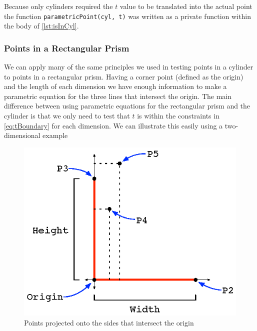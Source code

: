 \documentclass[authoryearcitations]{UoYCSproject}
\begin{document}
Because only cylinders required the $t$ value to be translated into the actual point the function 
\verb+parametricPoint(cyl, t)+ was written as a private function within the body of \ref{lst:isInCyl}.

\subsubsection{Points in a Rectangular Prism}
We can apply many of the same principles we used in testing points in a cylinder to points in a rectangular prism.
Having a corner point (defined as the origin) and the length of each dimension we have enough information to make a
parametric equation for the three lines that intersect the origin. The main difference between using parametric 
equations for the rectangular prism and the cylinder is that we only need to test that $t$ is within the constraints 
in \ref{eq:tBoundary} for each dimension. We can illustrate this easily using a two-dimensional example

\begin{figure}[h!]
  \centering
  \includegraphics[scale=1.2]{figures/recPrism.eps}
  \caption{Points projected onto the sides that intersect the origin}
\label{recPrism}
\end{figure}
\end{document}
